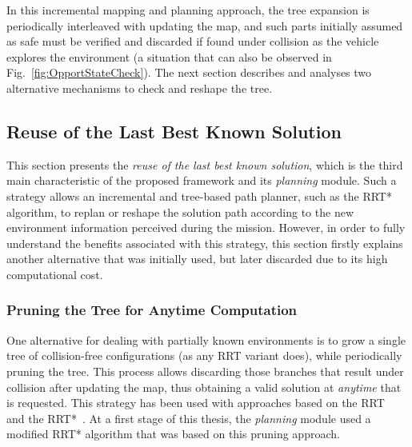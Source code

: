 In this incremental mapping and planning approach, the tree expansion is
periodically interleaved with updating the map, and such parts initially assumed
as safe must be verified and discarded if found under collision as the vehicle
explores the environment (a situation that can also be observed in
Fig.~\ref{fig:OpportStateCheck}). The next section describes and analyses two
alternative mechanisms to check and reshape the tree.

\subsection{Reuse of the Last Best Known Solution}
\label{sec:ReuseLastBestKnownSol}

This section presents the \textit{reuse of the last best known solution}, which
is the third main characteristic of the proposed framework and its
\textit{planning} module. Such a strategy allows an incremental and tree-based
path planner, such as the \ac{RRT*} algorithm, to replan or reshape the solution
path according to the new environment information perceived during the mission.
However, in order to fully understand the benefits associated with this
strategy, this section firstly explains another alternative that was initially
used, but later discarded due to its high computational cost.

\subsubsection{Pruning the Tree for Anytime Computation}

One alternative for dealing with partially known environments is to grow a
single tree of collision-free configurations (as any \ac{RRT} variant does),
while periodically pruning the tree. This process allows discarding those
branches that result under collision after updating the map, thus obtaining a
valid solution at \textit{anytime} that is requested. This strategy has been
used with approaches based on the \ac{RRT}~\cite{Bekris2007} and the
\ac{RRT*}~\cite{Karaman2011a}. At a first stage of this thesis, the
\textit{planning} module used a modified \ac{RRT*} algorithm that was based on
this pruning approach.

